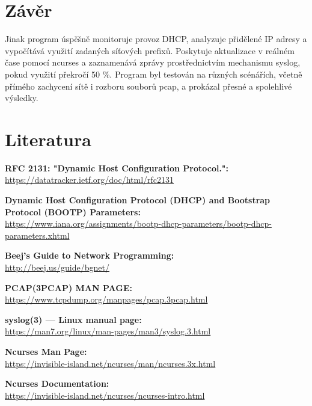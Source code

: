 \documentclass[a4paper, 11pt]{article}
\begin{document}
    \section{Závěr}

    Jinak program úspěšně monitoruje provoz DHCP, analyzuje přidělené IP adresy a vypočítává využití zadaných síťových prefixů. Poskytuje aktualizace v reálném čase pomocí ncurses a zaznamenává zprávy prostřednictvím mechanismu syslog, pokud využití překročí 50 \%. Program byl testován na různých scénářích, včetně přímého zachycení sítě i rozboru souborů pcap, a prokázal přesné a spolehlivé výsledky.

    \section{Literatura}

    \begin{enumerate}[label={[\arabic*]}]
        \item \textbf{RFC 2131: "Dynamic Host Configuration Protocol.":} \\
        \url{https://datatracker.ietf.org/doc/html/rfc2131}

        \item \textbf{Dynamic Host Configuration Protocol (DHCP) and Bootstrap Protocol (BOOTP) Parameters:} \\
        \url{https://www.iana.org/assignments/bootp-dhcp-parameters/bootp-dhcp-parameters.xhtml}

        \item \textbf{Beej's Guide to Network Programming:} \\
        \url{http://beej.us/guide/bgnet/}

        \item \textbf{PCAP(3PCAP) MAN PAGE:} \\
        \url{https://www.tcpdump.org/manpages/pcap.3pcap.html}

        \item \textbf{syslog(3) — Linux manual page:} \\
        \url{https://man7.org/linux/man-pages/man3/syslog.3.html}

        \item \textbf{Ncurses Man Page:} \\
        \url{https://invisible-island.net/ncurses/man/ncurses.3x.html}

        \item \textbf{Ncurses Documentation:} \\
        \url{https://invisible-island.net/ncurses/ncurses-intro.html}
    \end{enumerate}
\end{document}
